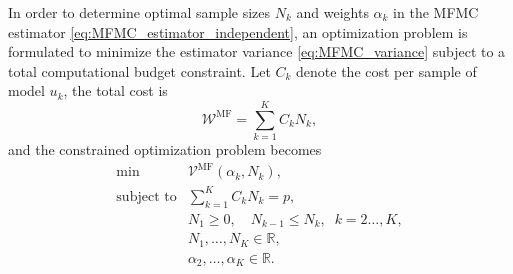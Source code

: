 In order to determine optimal sample sizes $N_k$ and weights $\alpha_k$ in the MFMC estimator \eqref{eq:MFMC_estimator_independent}, an optimization problem is formulated \cite{PeWiGu:2016} to minimize the estimator variance \eqref{eq:MFMC_variance} subject to a total computational budget constraint. Let $C_k$ denote the cost per sample of model $u_k$, the total cost is 
%
\[
\mathcal{W}^{\text{MF}} = \sum_{k=1}^K C_k N_k,
\]
%
and the constrained optimization problem becomes
%
\begin{equation}\label{eq:Optimization_pb_sample_size}
    \begin{array}{ll}
    \min &\mathcal{V}^{\text{MF}}\left(\alpha_k,N_k\right),\\
       \text{subject to} &\displaystyle\sum\limits_{k=1}^K C_kN_k=p,\\[2pt]
       &\displaystyle N_1\ge 0,\quad \displaystyle N_{k-1}\le N_k, \;\; k=2\ldots,K,\\
       &N_1,\ldots, N_K\in \mathbb{R},\\
       &\alpha_2,\ldots,\alpha_K\in \mathbb{R}.
    \end{array}
\end{equation}
%


